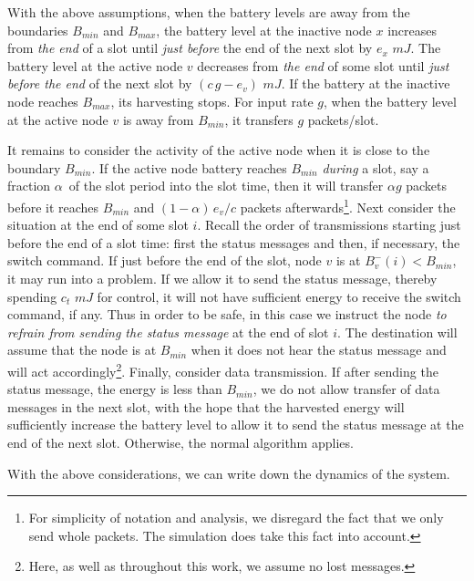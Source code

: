 \documentclass[12 pt]{article}
\newcommand{\debug}[1]{\mbox{\tt #1}}
\renewcommand{\debug}[1]{}              \newcommand{\cmd}[1]{}
\newcommand{\daddcontentsline}[3]{\addcontentsline{#1}{#2}{#3}}
\newcommand{\2}{\>\>}
\newcommand{\3}{\>\>\>}
\newcommand{\4}{\>\>\>\>}
\newcommand{\5}{\>\>\>\>\>}
\newcommand{\6}{\>\>\>\>\>\>}
\newcommand{\7}{\6\>}
\newcommand{\8}{\6\2}
\newcommand{\pname}{}
\newcommand{\ls}[1]{\renewcommand{\baselinestretch}{#1}\large \normalsize}
\newcounter{protblock}
\newcounter{line}[protblock]
\begin{document}
With the above assumptions, when the battery levels are away from the boundaries $B_{min}$ and $B_{max}$, the battery level at the inactive node $x$ increases from \emph{the end} of a slot until \emph{just before} the end of the next slot by $e_x\,\,mJ$.  The battery level at the active node $v$ decreases from \emph{the end} of some slot until \emph{just before the end} of the next slot by $(c\,g - e_v)\,\,mJ$.  If the battery at the inactive node reaches $B_{max}$, its harvesting stops.  For input rate $g$, when the battery level at the active node $v$ is away from $B_{min}$, it transfers $g$ packets/slot.

It remains to consider the activity of the active node when it is close to the boundary $B_{min}$.  If the active node battery reaches $B_{min}$ \emph{during} a slot, say a fraction $\alpha\,$ of the slot period into the slot time, then it will transfer $\alpha g $ packets before it reaches $B_{min}$  and  $(1-\alpha)\,e_v/c$ packets afterwards\footnote{For simplicity of notation and analysis, we disregard the fact that we only send whole packets.  The simulation does take this fact into account.}.
Next consider the situation at the end of some slot $i$.  Recall the order of transmissions starting just before the end of a slot time: first the status messages and then, if necessary, the switch command.  If just before the end of the slot, node $v$ is at $B^{-}_v(i) < B_{min}$,  it may run into a problem.  If we allow it to send the status message, thereby spending $c_t \,\, mJ$ for control, it will not have sufficient energy to receive the switch command, if any.  Thus in order to be safe, in this case we instruct the node \emph{to refrain from sending the status message} at the end of slot $i$.  The destination will assume that the node is at $B_{min}$ when it does not hear the status message and will act accordingly\footnote{Here, as well as throughout this work, we assume no lost messages.}.
Finally, consider data transmission.  If after sending the status message, the energy is less than $B_{min}$, we do not allow transfer of data messages in the next slot, with the hope that the harvested energy will sufficiently increase the battery level to allow it to send the status message at the end of the next slot.  Otherwise, the normal algorithm applies.

With the above considerations, we can write down the dynamics of the system.

\ls{0.3}\renewcommand{\pname}{B}\daddcontentsline{lot}{table}{\debug{\fbox{\pname}}}
\end{document}
